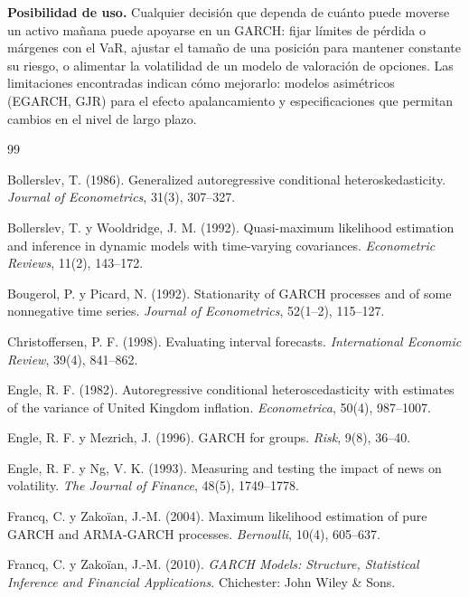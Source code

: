 \documentclass[legalpaper,11pt]{article}
\begin{document}
\textbf{Posibilidad de uso.} Cualquier decisión que dependa de cuánto puede moverse un
activo mañana puede apoyarse en un GARCH: fijar límites de pérdida o márgenes con el VaR,
ajustar el tamaño de una posición para mantener constante su riesgo, o alimentar la
volatilidad de un modelo de valoración de opciones. Las limitaciones encontradas indican
cómo mejorarlo: modelos asimétricos (EGARCH, GJR) para el efecto apalancamiento y
especificaciones que permitan cambios en el nivel de largo plazo.

\renewcommand{\refname}{Referencias bibliográficas}
\begin{thebibliography}{99}
\setlength{\itemsep}{0.1em}\small

Bollerslev, T. (1986). Generalized autoregressive conditional heteroskedasticity.
\emph{Journal of Econometrics}, 31(3), 307--327.

Bollerslev, T. y Wooldridge, J. M. (1992). Quasi-maximum likelihood estimation and inference
in dynamic models with time-varying covariances. \emph{Econometric Reviews}, 11(2), 143--172.

Bougerol, P. y Picard, N. (1992). Stationarity of GARCH processes and of some nonnegative
time series. \emph{Journal of Econometrics}, 52(1--2), 115--127.

Christoffersen, P. F. (1998). Evaluating interval forecasts. \emph{International Economic
Review}, 39(4), 841--862.

Engle, R. F. (1982). Autoregressive conditional heteroscedasticity with estimates of the
variance of United Kingdom inflation. \emph{Econometrica}, 50(4), 987--1007.

Engle, R. F. y Mezrich, J. (1996). GARCH for groups. \emph{Risk}, 9(8), 36--40.

Engle, R. F. y Ng, V. K. (1993). Measuring and testing the impact of news on volatility.
\emph{The Journal of Finance}, 48(5), 1749--1778.

Francq, C. y Zakoïan, J.-M. (2004). Maximum likelihood estimation of pure GARCH and
ARMA-GARCH processes. \emph{Bernoulli}, 10(4), 605--637.

Francq, C. y Zakoïan, J.-M. (2010). \emph{GARCH Models: Structure, Statistical Inference and
Financial Applications}. Chichester: John Wiley \& Sons.


\end{thebibliography}
\end{document}
